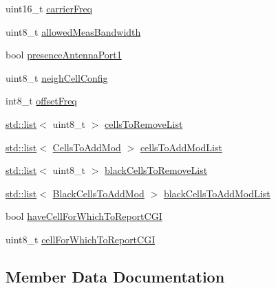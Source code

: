 \begin{DoxyCompactItemize}
\item 
uint16\+\_\+t \hyperlink{structns3_1_1LteRrcSap_1_1MeasObjectEutra_ae32ee7dbdcbbfa3342be19c103df4e26}{carrier\+Freq}
\item 
uint8\+\_\+t \hyperlink{structns3_1_1LteRrcSap_1_1MeasObjectEutra_a1926ebf2ffe8c7be064aeb5f46079c9a}{allowed\+Meas\+Bandwidth}
\item 
bool \hyperlink{structns3_1_1LteRrcSap_1_1MeasObjectEutra_aa038635f78449611f6227ca043910dec}{presence\+Antenna\+Port1}
\item 
uint8\+\_\+t \hyperlink{structns3_1_1LteRrcSap_1_1MeasObjectEutra_a3e293446841e448a852fdd853216988e}{neigh\+Cell\+Config}
\item 
int8\+\_\+t \hyperlink{structns3_1_1LteRrcSap_1_1MeasObjectEutra_a1f43d106d31a740df47e09dfddb8ad46}{offset\+Freq}
\item 
\hyperlink{openflow-interface_8h_afd9bcfa176617760671b67580f536fa7}{std\+::list}$<$ uint8\+\_\+t $>$ \hyperlink{structns3_1_1LteRrcSap_1_1MeasObjectEutra_a022a1f2b592d873dc1a9425ad62c5037}{cells\+To\+Remove\+List}
\item 
\hyperlink{openflow-interface_8h_afd9bcfa176617760671b67580f536fa7}{std\+::list}$<$ \hyperlink{structns3_1_1LteRrcSap_1_1CellsToAddMod}{Cells\+To\+Add\+Mod} $>$ \hyperlink{structns3_1_1LteRrcSap_1_1MeasObjectEutra_a090c205704e11029894f520c63db6343}{cells\+To\+Add\+Mod\+List}
\item 
\hyperlink{openflow-interface_8h_afd9bcfa176617760671b67580f536fa7}{std\+::list}$<$ uint8\+\_\+t $>$ \hyperlink{structns3_1_1LteRrcSap_1_1MeasObjectEutra_aac0b84b9b16fedf0d32735d254d81c88}{black\+Cells\+To\+Remove\+List}
\item 
\hyperlink{openflow-interface_8h_afd9bcfa176617760671b67580f536fa7}{std\+::list}$<$ \hyperlink{structns3_1_1LteRrcSap_1_1BlackCellsToAddMod}{Black\+Cells\+To\+Add\+Mod} $>$ \hyperlink{structns3_1_1LteRrcSap_1_1MeasObjectEutra_abd70e499aa359fec293f0646bd117103}{black\+Cells\+To\+Add\+Mod\+List}
\item 
bool \hyperlink{structns3_1_1LteRrcSap_1_1MeasObjectEutra_a02526130e000e92b8c2550c7ba95ddc4}{have\+Cell\+For\+Which\+To\+Report\+C\+GI}
\item 
uint8\+\_\+t \hyperlink{structns3_1_1LteRrcSap_1_1MeasObjectEutra_aa94ebebb94e498359135b91dc282460d}{cell\+For\+Which\+To\+Report\+C\+GI}
\end{DoxyCompactItemize}


\subsection{Member Data Documentation}
